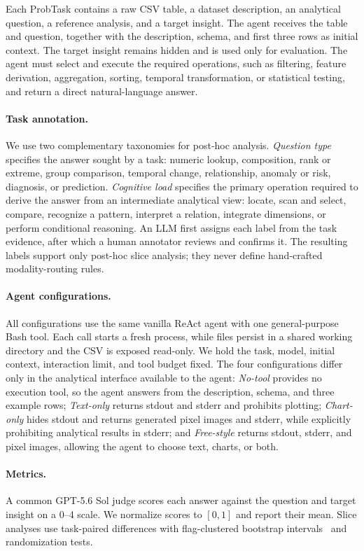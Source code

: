 \documentclass{article}
\begin{document}
Each ProbTask contains a raw CSV table, a dataset description, an analytical question, a reference analysis, and a target insight.
The agent receives the table and question, together with the description, schema, and first three rows as initial context.
The target insight remains hidden and is used only for evaluation.
The agent must select and execute the required operations, such as filtering, feature derivation, aggregation, sorting, temporal transformation, or statistical testing, and return a direct natural-language answer.

\paragraph{Task annotation.}
We use two complementary taxonomies for post-hoc analysis.
\emph{Question type} specifies the answer sought by a task: numeric lookup, composition, rank or extreme, group comparison, temporal change, relationship, anomaly or risk, diagnosis, or prediction.
\emph{Cognitive load} specifies the primary operation required to derive the answer from an intermediate analytical view: locate, scan and select, compare, recognize a pattern, interpret a relation, integrate dimensions, or perform conditional reasoning.
An LLM first assigns each label from the task evidence, after which a human annotator reviews and confirms it.
The resulting labels support only post-hoc slice analysis; they never define hand-crafted modality-routing rules.

\paragraph{Agent configurations.}
All configurations use the same vanilla ReAct agent with one general-purpose Bash tool.
Each call starts a fresh process, while files persist in a shared working directory and the CSV is exposed read-only.
We hold the task, model, initial context, interaction limit, and tool budget fixed.
The four configurations differ only in the analytical interface available to the agent:
\emph{No-tool} provides no execution tool, so the agent answers from the description, schema, and three example rows;
\emph{Text-only} returns stdout and stderr and prohibits plotting;
\emph{Chart-only} hides stdout and returns generated pixel images and stderr, while explicitly prohibiting analytical results in stderr; and
\emph{Free-style} returns stdout, stderr, and pixel images, allowing the agent to choose text, charts, or both.

\paragraph{Metrics.}
A common GPT-5.6 Sol judge scores each answer against the question and target insight on a 0--4 scale.
We normalize scores to $[0,1]$ and report their mean.
Slice analyses use task-paired differences with flag-clustered bootstrap intervals~\citep{efron1993bootstrap} and randomization tests.
\end{document}
